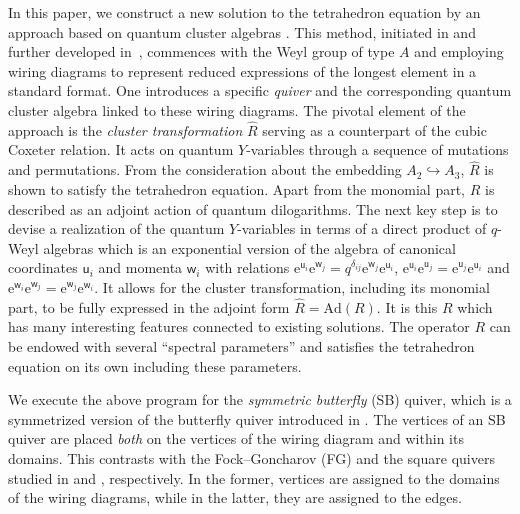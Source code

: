 \documentclass[pdftex]{sigma}
\newcommand{\e}{{\mathrm e}}
\newcommand{\uu}{{\mathsf u}}
\newcommand{\ww}{{\mathsf w}}
\numberwithin{equation}{section}
\begin{document}
In this paper, we construct a new solution to the tetrahedron equation
by an approach based on quantum cluster algebras \cite{FG09,FG09b}.
%
This method, initiated in \cite{SY22} and further developed in~\cite{IKT1, IKT2},
commences with the Weyl group of type $A$ and employing wiring diagrams
to represent reduced expressions of the longest element in a standard format.
One introduces a specific {\em quiver} and the corresponding quantum cluster algebra linked to these wiring diagrams.
The pivotal element of the approach is the {\em cluster transformation} $\hat{R}$
serving as a counterpart of the cubic Coxeter relation.
It acts on quantum $Y$-variables through a sequence of mutations and permutations.
From the consideration about the embedding $A_2 \hookrightarrow A_3$,
$\hat{R}$ is shown to satisfy the tetrahedron equation.
Apart from the monomial part, $\hat{R}$ is described as an adjoint action of quantum dilogarithms.
%
The next key step is to devise a realization of the quantum
$Y$-variables in terms of a direct product of $q$-Weyl algebras which
is an exponential version of the algebra of canonical coordinates
$\uu_i$ and momenta $\ww_i$ with relations
$\e^{\uu_i} \e^{\ww_j} = q^{\delta_{ij}}\e^{\ww_j} \e^{\uu_i}$,
$\e^{\uu_i} \e^{\uu_j} = \e^{\uu_j} \e^{\uu_i}$ and
$\e^{\ww_i} \e^{\ww_j} = \e^{\ww_j} \e^{\ww_i}$. It allows for the cluster
transformation, including its monomial part, to be fully expressed in
the adjoint form $\hat{R}= \mathrm{Ad}(R)$. It is this $R$ which has
many interesting features connected to existing solutions. The
operator $R$ can be endowed with several ``spectral parameters'' and
satisfies the tetrahedron equation on its own including these
parameters.

We execute the above program for the {\em symmetric butterfly} (SB)
quiver, which is a symmetrized version of the butterfly quiver
introduced in \cite{SY22}. The vertices of an SB quiver are placed
{\em both} on the vertices of the wiring diagram and within its
domains. This contrasts with the Fock--Goncharov (FG) and the square
quivers studied in \cite{IKT1} and \cite{IKT2,SY22}, respectively.
In the former, vertices are assigned to the domains of the wiring
diagrams, while in the latter, they are assigned to the edges.
\end{document}
